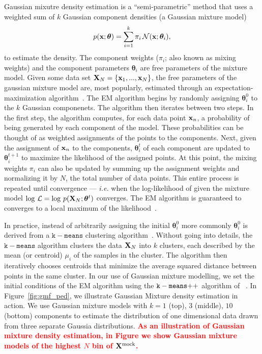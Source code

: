 \documentclass[12pt, letterpaper, preprint]{aastex}
\newcommand{\beq}{\begin{equation}}
\newcommand{\eeq}{\end{equation}}
\newcommand{\todo}[1]{{\bf \textcolor{red}{#1}}}
\newcommand{\Xmock}{{\bf X}^\mathrm{mock}}
\begin{document}
Gaussian mixutre density estimation is a ``semi-parametric'' method 
that uses a weighted sum of $k$ Gaussian component densities (a Gaussian 
mixture model)
\beq
p({\bf x}; \bm{\theta}) = \sum\limits_{i=1}^{k} \pi_i\, \mathcal{N}({\bf x}; \bm{\theta}_i),
\eeq
to estimate the density. 
The component weights ($\pi_i$; also known as mixing weights) and the 
component parameters $\bm{\theta}_i$ are free parameters of the mixture 
model. Given some data set ${\bf X}_N = \{{\bf x}_1,..., {\bf x}_N \}$, 
the free parameters of the gaussian mixture model are, most popularly, estimated 
through an expectation-maximization algorithm~\citep[EM;][]{dempster1977, neal1998}.
The EM algorithm begins by randomly assigning $\bm{\theta}^0_i$ to the 
$k$ Gaussian componenets. The algorithm then iterates between two steps. 
In the first step, the algorithm computes, for each data point ${\bf x}_n$, 
a probability of being generated by each component of the model. These 
probabilities can be thought of as weighted assignments of the points 
to the components. Next, given the assignment of ${\bf x}_n$ to the 
components, $\bm{\theta}^t_i$ of each component are updated to $\bm{\theta}^{t+1}_i$
to maximize the likelihood of the assigned points. At this point, the mixing 
weights $\pi_i$ can also be updated by summing up the assignment weights 
and normalizing it by $N$, the total number of data points. This entire
process is repeated until convergence --- \emph{i.e.} when the log-likelihood of 
given the mixture model $\log\,\mathcal{L} = \log\,p({\bf X}_N; \bm{\theta}^t)$ %
converges. The EM algorithm is guaranteed to converges to a local maximum 
of the likelihood~\citep{wu1983}. 

In practice, instead of arbitrarily assigning the initial $\bm{\theta}^0_i$
more commonly $\bm{\theta}^0_i$ is derived from a $\mathtt{k-means}$ 
clustering algorithm~\citep{lloyd1982}. Without going into details, the 
$\mathtt{k-means}$ algorithm clusters the data ${\bf X}_N$ into $k$ 
clusters, each described by the mean (or centroid) $\mu_i$ of the
samples in the cluster. The algorithm then iteratively chooses centroids that 
minimize the average squared distance between points in the same cluster.
In our use of Gaussian mixture modelling, we set the initial conditions of 
the EM algorithm using the $\mathtt{k-means}{\tiny ++}$ algorithm of ~\cite{arthur2007}. 
In Figure~\ref{fig:gmf_ped}, we illustrate Gaussian Mixture 
density estimation in action. We use Gaussian mixture models with 
$k = 1$ (top), $3$ (middle), $10$ (bottom) components to estimate the
distribution of one dimensional data drawn from three separate Gaussia 
distributions. 
\todo{As an illustration of Gaussian mixture 
density estimation, in Figure we show Gaussian mixture models of the 
highest $N$ bin of $\Xmock$.}
\end{document}
